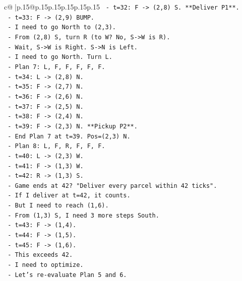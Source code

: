 \documentclass{article}
\begin{document}
{\begin{supertabular}{c@{$\;$}|p{.15\linewidth}@{}p{.15\linewidth}p{.15\linewidth}p{.15\linewidth}p{.15\linewidth}p{.15\linewidth}}
{{{\texttt{          {-} t=32: F {-}> (2,8) S. **Deliver P1**.} \\
\texttt{          {-} t=33: F {-}> (2,9) BUMP.} \\
\texttt{          {-} I need to go North to (2,3).} \\
\texttt{          {-} From (2,8) S, turn R (to W? No, S{-}>W is R).} \\
\texttt{          {-} Wait, S{-}>W is Right. S{-}>N is Left.} \\
\texttt{          {-} I need to go North. Turn L.} \\
\texttt{          {-} Plan 7: L, F, F, F, F, F.} \\
\texttt{            {-} t=34: L {-}> (2,8) N.} \\
\texttt{            {-} t=35: F {-}> (2,7) N.} \\
\texttt{            {-} t=36: F {-}> (2,6) N.} \\
\texttt{            {-} t=37: F {-}> (2,5) N.} \\
\texttt{            {-} t=38: F {-}> (2,4) N.} \\
\texttt{            {-} t=39: F {-}> (2,3) N. **Pickup P2**.} \\
\texttt{            {-} End Plan 7 at t=39. Pos=(2,3) N.} \\
\texttt{          {-} Plan 8: L, F, R, F, F, F.} \\
\texttt{            {-} t=40: L {-}> (2,3) W.} \\
\texttt{            {-} t=41: F {-}> (1,3) W.} \\
\texttt{            {-} t=42: R {-}> (1,3) S.} \\
\texttt{            {-} Game ends at 42? "Deliver every parcel within 42 ticks".} \\
\texttt{            {-} If I deliver at t=42, it counts.} \\
\texttt{            {-} But I need to reach (1,6).} \\
\texttt{            {-} From (1,3) S, I need 3 more steps South.} \\
\texttt{            {-} t=43: F {-}> (1,4).} \\
\texttt{            {-} t=44: F {-}> (1,5).} \\
\texttt{            {-} t=45: F {-}> (1,6).} \\
\texttt{            {-} This exceeds 42.} \\
\texttt{            {-} I need to optimize.} \\
\texttt{            {-} Let's re{-}evaluate Plan 5 and 6.} \\
}}}
\end{supertabular}}
\end{document}
